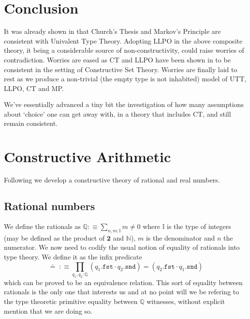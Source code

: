 \documentclass[12pt]{report}
\theoremstyle{definition}
\begin{document}
\chapter{Conclusion}
It was already shown in \cite{1905.03014} that Church's Thesis and Markov's Principle are consistent with Univalent Type Theory. 
Adopting LLPO in the above composite theory, it being a considerable source of non-constructivity, could raise worries of contradiction. 
Worries are eased as CT and LLPO have been shown in \cite{rathjen2018lifschitz} to be consistent in the setting of Constructive Set Theory. 
Worries are finally laid to rest as we produce a non-trivial (the empty type is not inhabited) model of UTT, LLPO, CT and MP. 

We've essentially advanced a tiny bit the investigation of how many assumptions about `choice' one can get away with, in a theory that includes CT, and still remain consistent. 
\appendix
\appendixpage
\addappheadtotoc
\chapter{Constructive Arithmetic}
Following \cite{bridges_richman_1987_2} we develop a constructive theory of rational and real numbers.
\section{Rational numbers}
We define the rationals as $\mathbb{Q} :\equiv \sum_{n,m: \mathbb{I}}m \neq 0$ where $\mathbb{I}$ is the type of integers (may be defined as the product of $\mathbf{2}$ and $\mathbb{N}$), $m$ is the denominator and $n$ the numerator. 
We now need to codify the usual notion of equality of rationals into type theory. 
We define it as the infix predicate
$$\doteq\; :\equiv \prod_{q_1, q_2 : \mathbb{Q}} (q_1.\mathtt{fst} \cdot q_2.\mathtt{snd}) = (q_2.\mathtt{fst} \cdot q_1.\mathtt{snd})$$
which can be proved to be an equivalence relation. 
This sort of equality between rationals is the only one that interests us and at no point will we be refering to the type theoretic primitive equality between $\mathbb{Q}$ witnesses, without explicit mention that we are doing so. 
\end{document}
